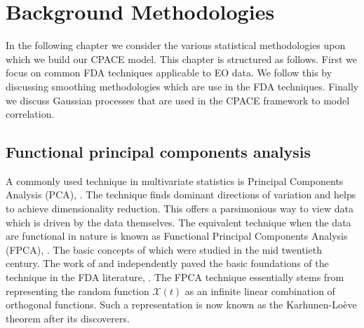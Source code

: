 
\chapter{Background Methodologies \label{cha:background}}  %


\ifpdf
    \graphicspath{{Chapter3/Figs/Raster/}{Chapter3/Figs/PDF/}{Chapter3/Figs/}}
\else
    \graphicspath{{Chapter3/Figs/Vector/}{Chapter3/Figs/}}
\fi

In the following chapter we consider the various statistical methodologies  upon which we build our CPACE model.
This chapter is structured as follows.
First we focus on common FDA techniques applicable to EO data.
We follow this by discussing smoothing methodologies which are use in the FDA techniques. 
Finally we discuss Gaussian processes that are used in the CPACE framework to model correlation. 

\section{Functional principal components analysis \label{sec:fpca}}
A commonly used technique in multivariate statistics is Principal Components Analysis (PCA), \citep{wold_principal_1987}. 
The technique finds dominant directions of variation and helps to achieve dimensionality reduction.
This offers a parsimonious way to view data which is driven by the data themselves.
The equivalent technique when the data are functional in nature is known as Functional Principal Components Analysis (FPCA), \citep{ramsay_functional_2010}.
The basic concepts of which were studied in the mid twentieth century.
The work of \citeauthor{karhunen_zur_1946} and independently \citeauthor{loeve_fonctions_1946} paved the basic foundations of the technique in the FDA literature, \citep{karhunen_zur_1946, loeve_fonctions_1946}.
The FPCA technique essentially stems from representing the random function $\mathcal{X}(t)$ as an infinite linear combination of orthogonal functions.
Such a representation is now known as the Karhunen-Lo\`{e}ve theorem after its discoverers.

